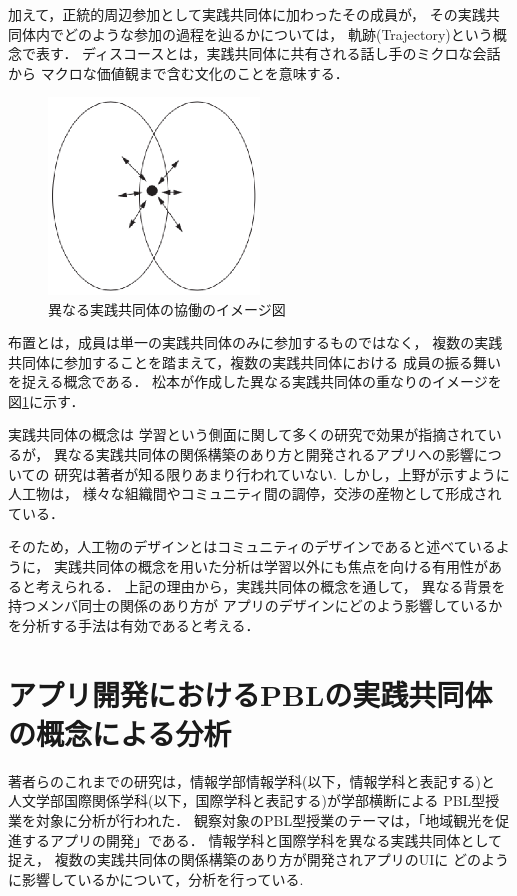 \documentclass[submit,techrep]{ipsj}
\begin{document}
加えて，正統的周辺参加として実践共同体に加わったその成員が，
その実践共同体内でどのような参加の過程を辿るかについては，
軌跡(Trajectory)という概念で表す．
ディスコースとは，実践共同体に共有される話し手のミクロな会話から
マクロな価値観まで含む文化のことを意味する\cite{discourse}．
\begin{figure}[h]
  \centering
  \includegraphics[width=0.5\textwidth]{img/overlap.eps}
  \caption{異なる実践共同体の協働のイメージ図}
  \label{overlap}
\end{figure}


布置とは，成員は単一の実践共同体のみに参加するものではなく，
複数の実践共同体に参加することを踏まえて，複数の実践共同体における
成員の振る舞いを捉える概念である\cite{Matsumoto}．
松本\cite{Matsumoto}が作成した異なる実践共同体の重なりのイメージを図\ref{overlap}に示す．




実践共同体の概念は
学習という側面に関して多くの研究で効果が指摘されているが，
異なる実践共同体の関係構築のあり方と開発されるアプリへの影響についての
研究は著者が知る限りあまり行われていない.
しかし，上野\cite{uenoArt}が示すように人工物は，
様々な組織間やコミュニティ間の調停，交渉の産物として形成されている．


そのため，人工物のデザインとはコミュニティのデザインであると述べているように，
実践共同体の概念を用いた分析は学習以外にも焦点を向ける有用性があると考えられる．
上記の理由から，実践共同体の概念を通して，
異なる背景を持つメンバ同士の関係のあり方が
アプリのデザインにどのよう影響しているかを分析する手法は有効であると考える．

\section{アプリ開発におけるPBLの実践共同体の概念による分析}
\label{previous-research-pbl}

著者らのこれまでの研究は，情報学部情報学科(以下，情報学科と表記する)と
人文学部国際関係学科(以下，国際学科と表記する)が学部横断による
PBL型授業を対象に分析が行われた．
観察対象のPBL型授業のテーマは，「地域観光を促進するアプリの開発」である．
情報学科と国際学科を異なる実践共同体として捉え，
複数の実践共同体の関係構築のあり方が開発されアプリのUIに
どのように影響しているかについて，分析を行っている.
\end{document}
